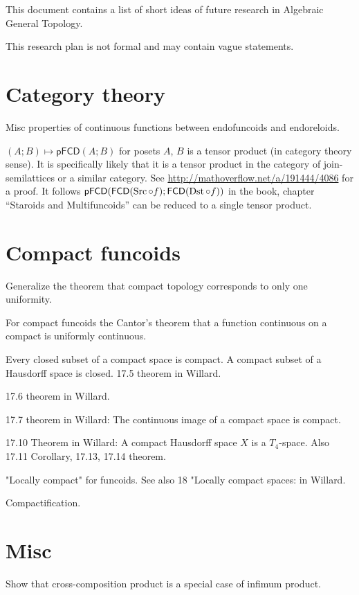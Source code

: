 \documentclass{amsart}
\begin{document}
This document contains a list of short ideas of future research in Algebraic
General Topology.

This research plan is not formal and may contain vague statements.

\section{Category theory}

Misc properties of continuous functions between endofuncoids and endoreloids.

$(A;B)\mapsto\mathsf{pFCD}(A;B)$ for posets $A$, $B$ is a tensor product
(in category theory sense). It is specifically likely that it is a tensor
product in the category of join-semilattices or a similar category.
See \url{http://mathoverflow.net/a/191444/4086} for a proof. It follows
$\mathsf{pFCD}(\mathsf{FCD}(\operatorname{Src}\circ f); \mathsf{FCD}(\operatorname{Dst}\circ f))$ in the book,
chapter ``Staroids and Multifuncoids'' can be reduced to a single tensor product.

\section{Compact funcoids}

Generalize the theorem that compact topology corresponds to only one uniformity.

For compact funcoids the Cantor's theorem that a function continuous on a compact is uniformly continuous.

Every closed subset of a compact space is compact. A compact subset of a Hausdorff space is closed. 17.5 theorem in Willard.

17.6 theorem in Willard.

17.7 theorem in Willard: The continuous image of a compact space is compact.

17.10 Theorem in Willard: A compact Hausdorff space $X$ is a $T_4$-space. Also 17.11 Corollary, 17.13, 17.14 theorem.

"Locally compact" for funcoids. See also 18 "Locally compact spaces: in Willard.

Compactification.

\section{Misc}

Show that cross-composition product is a special case of infimum product.
\end{document}
